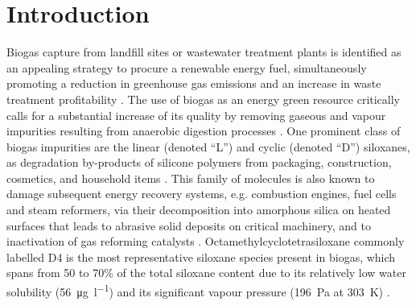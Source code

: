 

\section{Introduction}

Biogas capture from landfill sites or wastewater treatment plants is identified
as an appealing strategy to procure a renewable energy fuel, simultaneously
promoting a reduction in greenhouse gas emissions and an increase in waste
treatment profitability \citep{themelisMethaneGenerationLandfills2007}. The use
of biogas as an energy green resource critically calls for a substantial
increase of its  quality by removing gaseous and vapour impurities
resulting from anaerobic digestion processes
\citep{themelisMethaneGenerationLandfills2007}. One prominent class of biogas
impurities are the linear (denoted ``L'') and cyclic (denoted ``D'') siloxanes,
as degradation by-products of silicone polymers from packaging, construction,
cosmetics, and household items
\citep{takuwaCharacterizationTraceConstituents2009,
ohannessianVolatileOrganicSilicon2008}. This family of molecules is also known
to damage subsequent energy recovery systems, e.g. combustion engines, fuel
cells and steam reformers, via their decomposition into amorphous silica on
heated surfaces that leads to abrasive solid deposits on critical machinery, and
to inactivation of gas reforming catalysts
\citep{wangRecentAdvancesTechnologies2019}. Octamethylcyclotetrasiloxane
commonly labelled D4 is the most representative siloxane species present in
biogas, which spans from 50 to 70\% of the total siloxane content due to its
relatively low water solubility (\SI{56}{\micro\gram\per\litre}) and its
significant vapour pressure (\SI{196}{\pascal} at \SI{303}{\kelvin})
\citep{ohannessianVolatileOrganicSilicon2008,
wangRecentAdvancesTechnologies2019, dewilEnergyUseBiogas2006}.

